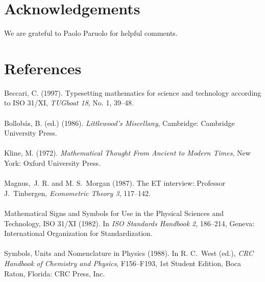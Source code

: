 \documentclass[11pt,dvips,a4paper]{article}
\begin{document}
\section*{Acknowledgements}
We are grateful to Paolo Paruolo for helpful comments.
%
\section*{References}
Beccari, C. (1997). Typesetting mathematics for science and technology
according to ISO 31/XI, {\it TUGboat 18}, No. 1, 39--48.\\
\ \\
Bollob\'{a}s, B. (ed.) (1986). {\it Littlewood's Miscellany\/}, Cambridge:
Cambridge University Press.\\
\ \\
Kline, M. (1972). {\it Mathematical Thought From Ancient to Modern Times\/},
New York: Oxford University Press.\\
\ \\
Magnus,~J. R. and M. S.~Morgan (1987). The ET interview: Professor
J.~Tinbergen, {\it Econometric Theory 3}, 117--142.\\
\ \\
Mathematical Signs and Symbols for Use in the Physical Sciences and
Technology, ISO 31/XI (1982). In {\it ISO Standards Handbook 2\/},
186--214, Geneva: International Organization for Standardization.\\
\ \\
Symbols, Units and Nomenclature in Physics (1988). In R. C.~West (ed.),
{\it CRC Handbook of Chemistry and Physics\/}, F156--F193, 1st Student Edition,
Boca Raton, Florida: CRC Press, Inc.
\end{document}
